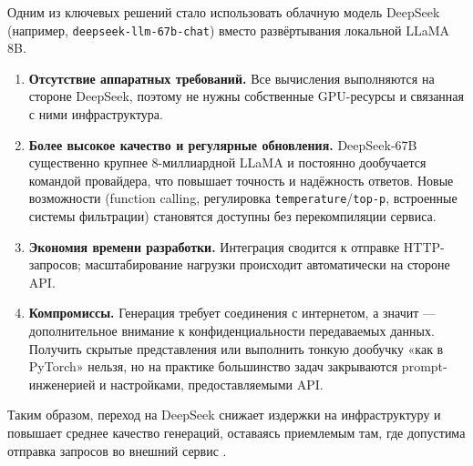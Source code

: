 Одним из ключевых решений стало использовать облачную модель DeepSeek (например, \texttt{deepseek-llm-67b-chat}) вместо развёртывания локальной LLaMA 8B.

\begin{enumerate}[label=\arabic*]
  \item \textbf{Отсутствие аппаратных требований.} 
        Все вычисления выполняются на стороне DeepSeek, поэтому не нужны собственные GPU-ресурсы и связанная с ними инфраструктура.

  \item \textbf{Более высокое качество и регулярные обновления.} 
        DeepSeek-67B существенно крупнее 8-миллиардной LLaMA и постоянно дообучается командой провайдера, что повышает точность и надёжность ответов. 
        Новые возможности (function calling, регулировка \texttt{temperature}/\texttt{top-p}, встроенные системы фильтрации) становятся доступны без перекомпиляции сервиса.

  \item \textbf{Экономия времени разработки.} 
        Интеграция сводится к отправке HTTP-запросов; масштабирование нагрузки происходит автоматически на стороне API.

  \item \textbf{Компромиссы.} 
        Генерация требует соединения с интернетом, а значит — дополнительное внимание к конфиденциальности передаваемых данных. 
        Получить скрытые представления или выполнить тонкую дообучку «как в PyTorch» нельзя, но на практике большинство задач закрываются prompt-инженерией и настройками, предоставляемыми API.
\end{enumerate}

Таким образом, переход на DeepSeek снижает издержки на инфраструктуру и повышает среднее качество генераций, оставаясь приемлемым там, где допустима отправка запросов во внешний сервис \cite{deepseek:docs}.

